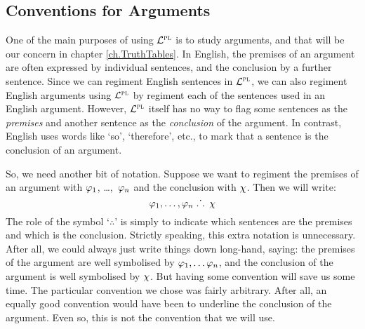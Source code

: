 \subsection{Conventions for Arguments}
  \label{sub:QuoteArguments}

One of the main purposes of using $\mathcal{L}^{\textsc{pl}}$ is to study arguments, and that will be our concern in chapter \ref{ch.TruthTables}.
In English, the premises of an argument are often expressed by individual sentences, and the conclusion by a further sentence.
Since we can regiment English sentences in $\mathcal{L}^{\textsc{pl}}$, we can also regiment English arguments using $\mathcal{L}^{\textsc{pl}}$ by regiment each of the sentences used in an English argument.
However, $\mathcal{L}^{\textsc{pl}}$ itself has no way to flag some sentences as the \emph{premises} and another sentence as the \emph{conclusion} of the argument.
In contrast, English uses words like `so', `therefore', etc., to mark that a sentence is the conclusion of an argument.


So, we need another bit of notation. Suppose we want to regiment the premises of an argument with $\varphi{}_1$, \dots,~$\varphi{}_n$ and the conclusion with $\chi{}$. Then we will write:
$$\varphi{}_1, \ldots, \varphi{}_n \; \ldotp\dot{}\,\ldotp \; \chi{}$$
The role of the symbol `$\therefore$' is simply to indicate which sentences are the premises and which is the conclusion.
Strictly speaking, this extra notation is unnecessary.
After all, we could always just write things down long-hand, saying: the premises of the argument are well symbolised by $\varphi{}_1, \ldots \varphi{}_n$, and the conclusion of the argument is well symbolised by $\chi{}$.
But having some convention will save us some time.
The particular convention we chose was fairly arbitrary.
After all, an equally good convention would have been to underline the conclusion of the argument.
Even so, this is not the convention that we will use.

